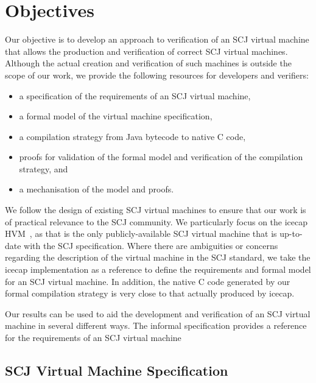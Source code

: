 \section{Objectives}

Our objective is to develop an approach to verification of an SCJ
virtual machine that allows the production and verification of correct
SCJ virtual machines.
Although the actual creation and verification of such machines is
outside the scope of our work, we provide the following resources for
developers and verifiers:
\begin{itemize}
\item a specification of the requirements of an SCJ virtual machine,
\item a formal model of the virtual machine specification,
\item a compilation strategy from Java bytecode to native C code,
\item proofs for validation of the formal model and verification of
  the compilation strategy, and
\item a mechanisation of the model and proofs.
\end{itemize}

We follow the design of existing SCJ virtual machines to ensure that
our work is of practical relevance to the SCJ community.
We particularly focus on the icecap HVM~\cite{sondergaard2012}, as
that is the only publicly-available SCJ virtual machine that is
up-to-date with the SCJ specification.
Where there are ambiguities or concerns regarding the description of
the virtual machine in the SCJ standard, we take the icecap
implementation as a reference to define the requirements and formal
model for an SCJ virtual machine.
In addition, the native C code generated by our formal compilation
strategy is very close
to that actually produced by icecap.

Our results can be used to aid the development and verification of an
SCJ virtual machine in several different ways.
The informal specification provides a reference for the requirements
of an SCJ virtual machine


\subsection{SCJ Virtual Machine Specification}


